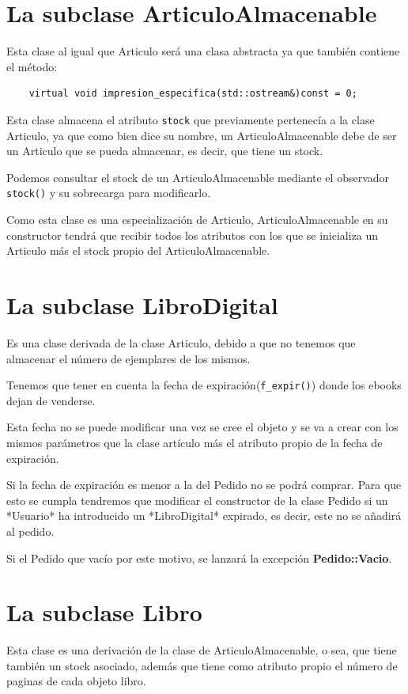 \section{La subclase ArticuloAlmacenable}
Esta clase al igual que Articulo será una clasa abstracta ya que también contiene el método:
\begin{center}
  \begin{verbatim}
    virtual void impresion_especifica(std::ostream&)const = 0;
  \end{verbatim}
\end{center}

Esta clase almacena el atributo \texttt{stock} que previamente pertenecía a la clase Articulo, ya que como bien dice su nombre, un ArticuloAlmacenable debe de ser un Articulo que se pueda almacenar, es decir, que tiene un stock.

Podemos consultar el stock de un ArticuloAlmacenable mediante el observador \texttt{stock()} y su sobrecarga para modificarlo.

Como esta clase es una especialización de Articulo, ArticuloAlmacenable en su constructor tendrá que recibir todos los atributos con los que se inicializa un Articulo más el stock propio del ArticuloAlmacenable.

\section{La subclase LibroDigital}
Es una clase derivada de la clase Articulo, debido a que no tenemos que almacenar el número de ejemplares de los mismos.

Tenemos que tener en cuenta la fecha de expiración(\texttt{f\_expir()}) donde los ebooks dejan de venderse.

Esta fecha no se puede modificar una vez se cree el objeto y se va a crear con los mismos parámetros que la clase artículo más el atributo propio de la fecha de expiración.

Si la fecha de expiración es menor a la del Pedido no se podrá comprar. Para que esto se cumpla tendremos que modificar el constructor de la clase Pedido si un *Usuario* ha introducido un *LibroDigital* expirado, es decir, este no se añadirá al pedido.

Si el Pedido que vacío por este motivo, se lanzará la excepción \textbf{Pedido::Vacio}.

\section{La subclase Libro}
Esta clase es una derivación de la clase de ArticuloAlmacenable, o sea, que tiene también un stock asociado, además que tiene como atributo propio el número de paginas de cada objeto libro.

